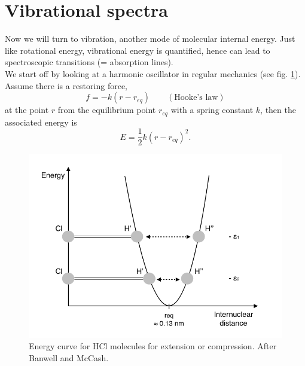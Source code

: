 \documentclass[a4paper,fleqn]{article}
\begin{document}
\section{Vibrational spectra}
Now we will turn to vibration, another mode of molecular internal energy. Just like rotational energy, vibrational energy is quantified, hence can lead to spectroscopic transitions (= absorption lines). \\
We start off by looking at a harmonic oscillator in regular mechanics (see fig. \ref{Vibration_parabol}). Assume there is a restoring force,
\begin{equation}
f = -k (r-r_{eq}) \qquad (\text{Hooke's law})
\end{equation}
at the point $r$ from the equilibrium point $r_{eq}$ with a spring constant $k$, then the associated energy is
\begin{equation}
E = \frac{1}{2}k (r-r_{eq})^2 .
\end{equation}

\begin{figure}[htbp]
\begin{center}
\includegraphics[width=1\textwidth]{figures/Vibration_parabol}
\caption{Energy curve for HCl molecules for extension or compression. After Banwell and McCash.}
\label{Vibration_parabol}
\end{center}
\end{figure}
\end{document}
